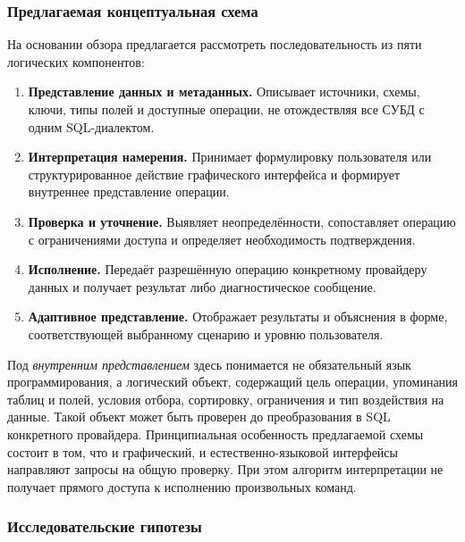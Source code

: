 \subsubsection{Предлагаемая концептуальная схема}

На основании обзора предлагается рассмотреть последовательность из пяти логических компонентов:
\begin{enumerate}
\item \textbf{Представление данных и метаданных.} Описывает источники, схемы, ключи, типы полей и доступные операции, не отождествляя все СУБД с одним SQL-диалектом.
\item \textbf{Интерпретация намерения.} Принимает формулировку пользователя или структурированное действие графического интерфейса и формирует внутреннее представление операции.
\item \textbf{Проверка и уточнение.} Выявляет неопределённости, сопоставляет операцию с ограничениями доступа и определяет необходимость подтверждения.
\item \textbf{Исполнение.} Передаёт разрешённую операцию конкретному провайдеру данных и получает результат либо диагностическое сообщение.
\item \textbf{Адаптивное представление.} Отображает результаты и объяснения в форме, соответствующей выбранному сценарию и уровню пользователя.
\end{enumerate}

Под \emph{внутренним представлением} здесь понимается не обязательный язык программирования, а логический объект, содержащий цель операции, упоминания таблиц и полей, условия отбора, сортировку, ограничения и тип воздействия на данные. Такой объект может быть проверен до преобразования в SQL конкретного провайдера. Принципиальная особенность предлагаемой схемы состоит в том, что и графический, и естественно-языковой интерфейсы направляют запросы на общую проверку. При этом алгоритм интерпретации не получает прямого доступа к исполнению произвольных команд.

\subsubsection{Исследовательские гипотезы}

